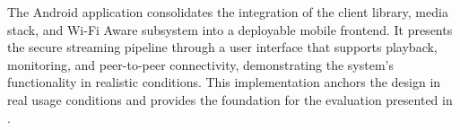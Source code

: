 \quad The Android application consolidates the integration of the client library, media stack, and Wi-Fi Aware subsystem into a deployable mobile frontend. It presents the secure streaming pipeline through a user interface that supports playback, monitoring, and peer-to-peer connectivity, demonstrating the system’s functionality in realistic conditions. This implementation anchors the design in real usage conditions and provides the foundation for the evaluation presented in \textbf{}.




\newpage

%
%
%
